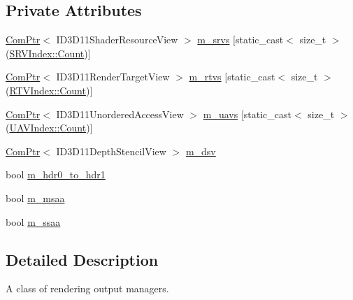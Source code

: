 \subsection*{Private Attributes}
\begin{DoxyCompactItemize}
\item 
\hyperlink{namespacemage_ae74f374780900893caa5555d1031fd79}{Com\+Ptr}$<$ I\+D3\+D11\+Shader\+Resource\+View $>$ \hyperlink{classmage_1_1_rendering_output_manager_af0443196d91297ccaff675a90a69adff}{m\+\_\+srvs} \mbox{[}static\+\_\+cast$<$ size\+\_\+t $>$(\hyperlink{classmage_1_1_rendering_output_manager_a25aa12ba77bb160c5641cf54f7a68a29ae93f994f01c537c4e2f7d8528c3eb5e9}{S\+R\+V\+Index\+::\+Count})\mbox{]}
\item 
\hyperlink{namespacemage_ae74f374780900893caa5555d1031fd79}{Com\+Ptr}$<$ I\+D3\+D11\+Render\+Target\+View $>$ \hyperlink{classmage_1_1_rendering_output_manager_a319f9b33395053ea23be97768410942c}{m\+\_\+rtvs} \mbox{[}static\+\_\+cast$<$ size\+\_\+t $>$(\hyperlink{classmage_1_1_rendering_output_manager_aebe136819797593f0fcf53b753e9c3ceae93f994f01c537c4e2f7d8528c3eb5e9}{R\+T\+V\+Index\+::\+Count})\mbox{]}
\item 
\hyperlink{namespacemage_ae74f374780900893caa5555d1031fd79}{Com\+Ptr}$<$ I\+D3\+D11\+Unordered\+Access\+View $>$ \hyperlink{classmage_1_1_rendering_output_manager_ad4e780e6340b18f601a1fcfa9dd1b297}{m\+\_\+uavs} \mbox{[}static\+\_\+cast$<$ size\+\_\+t $>$(\hyperlink{classmage_1_1_rendering_output_manager_a34cdd58dd0dda9d78878d79aa3393b89ae93f994f01c537c4e2f7d8528c3eb5e9}{U\+A\+V\+Index\+::\+Count})\mbox{]}
\item 
\hyperlink{namespacemage_ae74f374780900893caa5555d1031fd79}{Com\+Ptr}$<$ I\+D3\+D11\+Depth\+Stencil\+View $>$ \hyperlink{classmage_1_1_rendering_output_manager_a3c6290fd9b186fbe56a47adb6d774ccf}{m\+\_\+dsv}
\item 
bool \hyperlink{classmage_1_1_rendering_output_manager_ae2164d5657239162591cdcdefa75e240}{m\+\_\+hdr0\+\_\+to\+\_\+hdr1}
\item 
bool \hyperlink{classmage_1_1_rendering_output_manager_ab28e6451a0c2eb918b63ae312018ffe1}{m\+\_\+msaa}
\item 
bool \hyperlink{classmage_1_1_rendering_output_manager_a944bc441357c9e1b6af74ec5c393fb63}{m\+\_\+ssaa}
\end{DoxyCompactItemize}


\subsection{Detailed Description}
A class of rendering output managers. 

